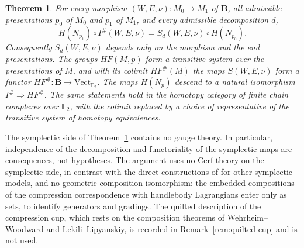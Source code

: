 \documentclass[11pt]{amsart}
\theoremstyle{definition}
\theoremstyle{remark}
\theoremstyle{plain}
\newtheorem{thmletter}{Theorem}
\numberwithin{equation}{section}
\newcommand{\FF}{\mathbb{F}_2}
\newcommand{\bB}{\mathbf{B}}
\newcommand{\Ish}{I^{\#}}
\newcommand{\HF}{\mathit{HF}}
\begin{document}
\begin{thmletter}\label{thm:A}
For every morphism $(W,E,\nu)\colon M_0\to M_1$ of $\bB$, all admissible
presentations $p_0$ of $M_0$ and $p_1$ of $M_1$, and every admissible
decomposition $d$,
\[
H(N_{p_1})\circ\Ish(W,E,\nu)=S_d(W,E,\nu)\circ H(N_{p_0}).
\]
Consequently $S_d(W,E,\nu)$ depends only on the morphism and the end
presentations. The groups $\HF(M,p)$ form a transitive system over the
presentations of $M$, and with its colimit $\HF^{\#}(M)$ the maps
$S(W,E,\nu)$ form a functor $\HF^{\#}\colon\bB\to\mathrm{Vect}_{\FF}$.
The maps $H(N_p)$ descend to a natural isomorphism
$\Ish\Rightarrow\HF^{\#}$. The same statements hold in the homotopy
category of finite chain complexes over $\FF$, with the colimit replaced by
a choice of representative of the transitive system of homotopy
equivalences.
\end{thmletter}

The symplectic side of Theorem~\ref{thm:A} contains no gauge theory. In
particular, independence of the decomposition and functoriality of the
symplectic maps are consequences, not hypotheses. The argument uses no
Cerf theory on the symplectic side, in contrast with the direct constructions
of \cite{Caz-nat, Hor2} for other symplectic models, and no geometric composition
isomorphism: the embedded compositions of the compression correspondence
with handlebody Lagrangians enter only as sets, to identify generators and
gradings. The quilted description of the compression cup, which rests on
the composition theorems of Wehrheim--Woodward and Lekili--Lipyanskiy, is
recorded in Remark~\ref{rem:quilted-cup} and is not used.
\end{document}
